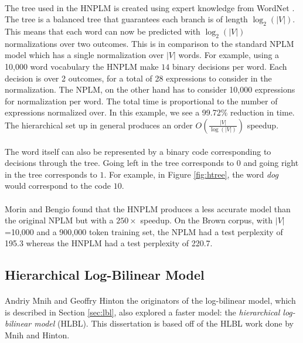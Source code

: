 \paragraph{}
The tree used in the HNPLM is created using expert knowledge from WordNet \cite{MorinBengio2005}. The tree is a balanced tree that guarantees each branch is of length $\log_2(|V|)$. This means that each word can now be predicted with $\log_2(|V|)$ normalizations over two outcomes. This is in comparison to the standard NPLM model which has a single normalization over $|V|$ words. For example, using a 10,000 word vocabulary the HNPLM make $14$ binary decisions per word. Each decision is over 2 outcomes, for a total of 28 expressions to consider in the normalization. The NPLM, on the other hand has to consider 10,000 expressions for normalization per word. The total time is proportional to the number of expressions normalized over. In this example, we see a 99.72\% reduction in time. The hierarchical set up in general produces an order $O(\frac{|V|}{\log(|V|)})$ speedup.

\paragraph{}
The word itself can also be represented by a binary code corresponding to decisions through the tree. Going left in the tree corresponds to $0$ and going right in the tree corresponds to $1$. For example, in Figure \ref{fig:htree}, the word \emph{dog} would correspond to the code $10$.

\paragraph{}
Morin and Bengio found that the HNPLM produces a less accurate model than the original NPLM but with a $250\times$ speedup. On the Brown corpus, with $|V|$=10,000 and a 900,000 token training set, the NPLM had a test perplexity of 195.3 whereas the HNPLM had a test perplexity of 220.7.

\subsection{Hierarchical Log-Bilinear Model} \label{sec:HLBL}
\paragraph{}
Andriy Mnih and Geoffry Hinton the originators of the log-bilinear model, which is described in Section \ref{sec:lbl},  also explored a faster model: the \emph{hierarchical log-bilinear model} (HLBL). This dissertation is based off of the HLBL work done by Mnih and Hinton. 

